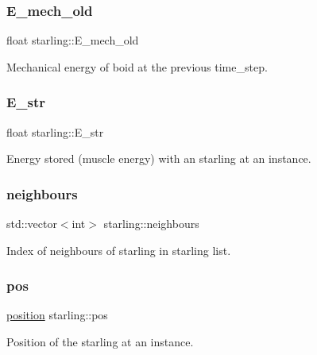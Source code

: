 \subsubsection{\texorpdfstring{E\+\_\+mech\+\_\+old}{E\_mech\_old}}
{\footnotesize\ttfamily float starling\+::\+E\+\_\+mech\+\_\+old}



Mechanical energy of boid at the previous time\+\_\+step. 

\mbox{\label{classstarling_a853076e896a808f546ac5a405dd7c48e}} 
\subsubsection{\texorpdfstring{E\+\_\+str}{E\_str}}
{\footnotesize\ttfamily float starling\+::\+E\+\_\+str}



Energy stored (muscle energy) with an starling at an instance. 

\mbox{\label{classstarling_a938ea67b6db6f498070095fc6de15179}} 
\subsubsection{\texorpdfstring{neighbours}{neighbours}}
{\footnotesize\ttfamily std\+::vector$<$int$>$ starling\+::neighbours}



Index of neighbours of starling in starling list. 

\mbox{\label{classstarling_ace1e958bb7963210ca9da7c0454c503e}} 
\subsubsection{\texorpdfstring{pos}{pos}}
{\footnotesize\ttfamily \mbox{\hyperlink{classposition}{position}} starling\+::pos}



Position of the starling at an instance. 

\mbox{\label{classstarling_ad16101cd58b17920b62adf606b1e5dca}} 
